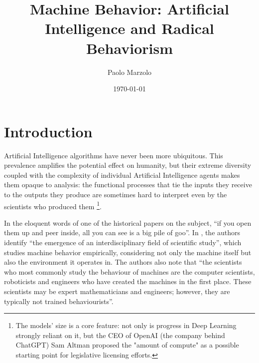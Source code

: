 \documentclass[letterpaper,11pt,twocolumn]{article}
\title{Machine Behavior: Artificial Intelligence and Radical Behaviorism}
\author{Paolo Marzolo}
\date{\today}
\begin{document}

\section*{Introduction}
Artificial Intelligence algorithms have never been more ubiquitous. This prevalence amplifies the potential effect on humanity, but their extreme diversity coupled with the complexity of individual Artificial Intelligence agents makes them opaque to analysis: the functional processes that tie the inputs they receive to the outputs they produce are sometimes hard to interpret even by the scientists who produced them \footnote{The models' size is a core feature: not only is progress in Deep Learning strongly reliant on it\cite{thompsonComputationalLimitsDeep2022}, but the CEO of OpenAI (the company behind ChatGPT) Sam Altman proposed the "amount of compute" as a possible starting point for legislative licensing efforts.}.

In the eloquent words of one of the historical papers on the subject, \enquote{if you open them up and peer inside, all you can see is a big pile of goo}\cite{mozerUsingRelevanceReduce1989a}.
In \cite{rahwanMachineBehaviour2019}, the authors identify \enquote{the emergence of an interdisciplinary field of scientific study}, which studies machine behavior empirically, considering not only the machine itself but also the environment it operates in. The authors also note that \enquote{the scientists who most commonly study the behaviour of machines are the computer scientists, roboticists and engineers who have created the machines in the first place. These scientists may be expert mathematicians and engineers; however, they are typically not trained behaviourists}.
\end{document}
